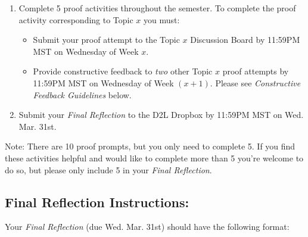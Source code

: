 \begin{enumerate}

\item Complete 5 proof activities throughout the semester. To complete the proof activity corresponding to Topic $x$ you must:

\begin{itemize}

\item Submit your proof attempt to the Topic $x$ Discussion Board by 11:59PM MST on Wednesday of Week $x$.

\item Provide constructive feedback to \emph{two} other Topic $x$ proof attempts by 11:59PM MST on Wednesday of Week $(x+1)$. Please see \emph{Constructive Feedback Guidelines} below.

\end{itemize}

\item Submit your \emph{Final Reflection} to the D2L Dropbox by 11:59PM MST on Wed. Mar. 31st.

\end{enumerate}

\noindent Note: There are 10 proof prompts, but you only need to complete 5. If you find these activities helpful and would like to complete more than 5 you're welcome to do so, but please only include 5 in your \emph{Final Reflection}.

\subsection*{Final Reflection Instructions:}

Your \emph{Final Reflection} (due Wed. Mar. 31st) should have the following format:

